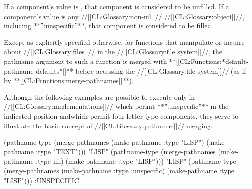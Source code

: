 If a component's value is \nil, that component is considered to be unfilled. If a component's value is any //[[CL:Glossary:non-nil]]// //[[CL:Glossary:object]]//,  including **'':unspecific''**, that component is considered to be filled.

Except as explicitly specified otherwise, for functions that manipulate or inquire about //[[CL:Glossary:files]]// in the //[[CL:Glossary:file system]]//, the pathname argument to such a function is merged with **[[CL:Functions:*default-pathname-defaults*]]** before accessing the //[[CL:Glossary:file system]]// (as if by **[[CL:Functions:merge-pathnames]]**).


Although the following examples are possible to execute only in //[[CL:Glossary:implementations]]// which permit **'':unspecific''** in the indicated position andwhich permit four-letter type components, they serve to illustrate the basic concept of //[[CL:Glossary:pathname]]// merging.

\medbreak \code
 (pathname-type 
   (merge-pathnames (make-pathname :type "LISP")
                    (make-pathname :type "TEXT"))) \EV "LISP" \smallbreak
 (pathname-type 
   (merge-pathnames (make-pathname :type nil)
                    (make-pathname :type "LISP"))) \EV "LISP" \smallbreak
 (pathname-type 
   (merge-pathnames (make-pathname :type :unspecific)
                    (make-pathname :type "LISP"))) \EV :UNSPECIFIC \endcode

\endsubsubsection%

\endsubSection%

